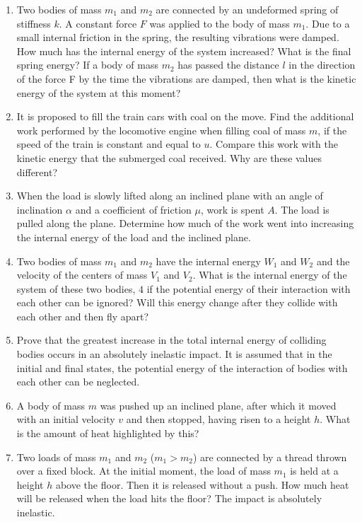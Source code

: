 \documentclass{article}
\begin{document}
\begin{enumerate}[label=2.4.\arabic*]
\item Two bodies of mass $m_1$ and $m_2$ are connected by an undeformed spring of stiffness $k$. A constant force $F$ was applied to the body of mass $m_1$. Due to a small internal friction in the spring, the resulting vibrations were damped. How much has the internal energy of the system increased? What is the final spring energy? If a body of mass $m_2$ has passed the distance $l$ in the direction of the force F by the time the vibrations are damped, then what is the kinetic energy of the system at this moment?

\item It is proposed to fill the train cars with coal on the move. Find the additional work performed by the locomotive engine when filling coal of mass $m$, if the speed of the train is constant and equal to $u$. Compare this work with the kinetic energy that the submerged coal received. Why are these values different?

\item When the load is slowly lifted along an inclined plane with an angle of inclination $\alpha$ and a coefficient of friction $\mu$, work is spent $A$. The load is pulled along the plane. Determine how much of the work went into increasing the internal energy of the load and the inclined plane.

\item Two bodies of mass $m_1$ and $m_2$ have the internal energy $W_1$ and $W_2$ and the velocity of the centers of mass $V_1$ and $V_2$. What is the internal energy of the system of these two bodies, $4$ if the potential energy of their interaction with each other can be ignored? Will this energy change after they collide with each other and then fly apart?

\item Prove that the greatest increase in the total internal energy of colliding bodies occurs in an absolutely inelastic impact. It is assumed that in the initial and final states, the potential energy of the interaction of bodies with each other can be neglected.

\item A body of mass $m$ was pushed up an inclined plane, after which it moved with an initial velocity $v$ and then stopped, having risen to a height $h$. What is the amount of heat highlighted by this?

\item Two loads of mass $m_1$ and $m_2$ ($m_1 > m_2$) are connected by a thread thrown over a fixed block. At the initial moment, the load of mass $m_1$ is held at a height $h$ above the floor. Then it is released without a push. How much heat will be released when the load hits the floor? The impact is absolutely inelastic.


\end{enumerate}
\end{document}
